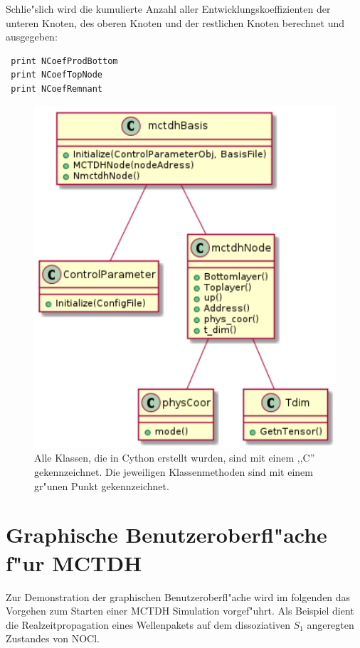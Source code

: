 Schlie"slich wird die kumulierte Anzahl aller Entwicklungskoeffizienten der unteren Knoten, des oberen Knoten
und der restlichen Knoten berechnet und ausgegeben:
\begin{verbatim}
 print NCoefProdBottom 
 print NCoefTopNode 
 print NCoefRemnant
\end{verbatim}
    
\begin{figure}
    \centering
    \includegraphics[scale=0.6]{figures/sequenceDiagram}
    \caption{Alle Klassen, die in Cython erstellt wurden, sind mit einem ,,C'' gekennzeichnet. Die jeweiligen Klassenmethoden sind mit einem
    gr"unen Punkt gekennzeichnet.}\label{fig:uml_Cython}
\end{figure}








\section{Graphische Benutzeroberfl"ache f"ur MCTDH}

Zur Demonstration der graphischen Benutzeroberfl"ache wird im folgenden das Vorgehen zum Starten einer 
MCTDH Simulation vorgef"uhrt. Als Beispiel dient die Realzeitpropagation eines Wellenpakets auf dem
dissoziativen $S_1$ angeregten Zustandes von NOCl.

